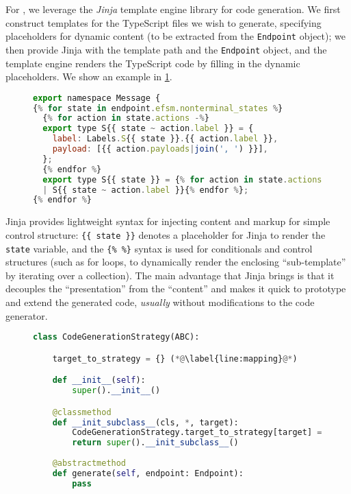 For \codegen, we leverage the \textit{Jinja} \cite{jinja} 
template engine library for code generation. 
We first construct templates for the TypeScript files 
we wish to generate,
specifying placeholders for dynamic content (to be extracted
from the \texttt{Endpoint} object); 
we then provide Jinja with the template path and the 
\texttt{Endpoint} object, and the template engine renders the
TypeScript code by filling in the dynamic placeholders. 
We show an example in \cref{lst:jinja}.

\begin{figure}[!ht]
\begin{lstlisting}[language=javascript, title=efsm.ts.j2]
export namespace Message {
{% for state in endpoint.efsm.nonterminal_states %}
  {% for action in state.actions -%}
  export type S{{ state ~ action.label }} = {
    label: Labels.S{{ state }}.{{ action.label }},
    payload: [{{ action.payloads|join(', ') }}],
  };
  {% endfor %}
  export type S{{ state }} = {% for action in state.actions -%}
  | S{{ state ~ action.label }}{% endfor %};
{% endfor %}
\end{lstlisting}
\label{lst:jinja}
\end{figure}

Jinja provides lightweight syntax for injecting content and
markup for simple control structure: \texttt{\{\{ state \}\}} 
denotes a placeholder for Jinja to render the \texttt{state} variable,
and the \texttt{\{\% \%\}} syntax  is used for conditionals and
control structures 
(such as for loops, to dynamically render the 
enclosing ``sub-template''
by iterating over a collection).
The main advantage that Jinja brings is that 
it decouples the ``presentation''
from the ``content'' and makes it quick to prototype and extend
the generated code, \textit{usually} without modifications to the 
code generator.

\begin{figure}[!ht]
\begin{lstlisting}[language=python]
class CodeGenerationStrategy(ABC):

    target_to_strategy = {} (*@\label{line:mapping}@*)

    def __init__(self):
        super().__init__()

    @classmethod
    def __init_subclass__(cls, *, target):
        CodeGenerationStrategy.target_to_strategy[target] = cls (*@\label{line:registerstrategy}@*)
        return super().__init_subclass__()
    
    @abstractmethod
    def generate(self, endpoint: Endpoint):
        pass
\end{lstlisting}
\label{lst:codegenerationstrategy}
\end{figure}

